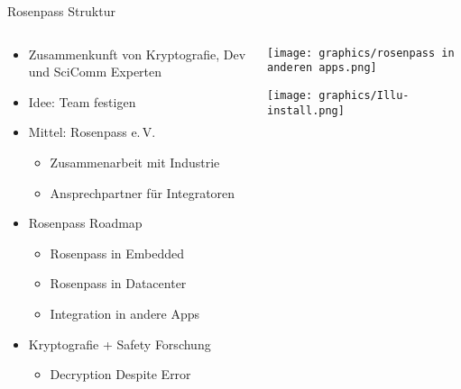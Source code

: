 \documentclass{rosenpass-beamer}
\begin{document}
\begin{frame}{Rosenpass Struktur}
\begin{columns}[c]
\begin{column}{0.7\textwidth}
\begin{itemize}
\item  Zusammenkunft von Kryptografie, Dev und SciComm Experten
\item  Idee: Team festigen
\item  Mittel: Rosenpass e.\,V.

  \begin{itemize}
    \item Zusammenarbeit mit Industrie
  \item Ansprechpartner für Integratoren
  \end{itemize}
\item  Rosenpass Roadmap

  \begin{itemize}
    \item Rosenpass in Embedded
  \item Rosenpass in Datacenter
  \item Integration in andere Apps
  \end{itemize}
\item  Kryptografie + Safety Forschung

  \begin{itemize}
    \item Decryption Despite Error
  \end{itemize}
\end{itemize}
\end{column}

\begin{column}{0.2\textwidth}
\texttt{[image: graphics/rosenpass in anderen apps.png]}

\medskip
\texttt{[image: graphics/Illu-install.png]}

\end{column}
\end{columns}
\end{frame}
\end{document}
